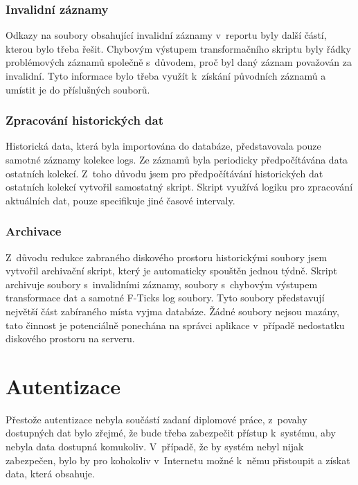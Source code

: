 \documentclass[thesis=M,czech]{FITthesis}[2012/06/26]
\begin{document}
      \subsubsection{Invalidní záznamy}

        Odkazy na soubory obsahující invalidní záznamy v~reportu
        byly další částí, kterou bylo třeba řešit.
        Chybovým výstupem transformačního skriptu byly řádky
        problémových záznamů společně s~důvodem, proč byl daný záznam považován za invalidní.
        Tyto informace bylo třeba využít k~získání původních záznamů a umístit je do příslušných souborů.

      \subsubsection{Zpracování historických dat}
        
        Historická data, která byla importována do databáze,
        představovala pouze samotné záznamy kolekce logs.
        Ze záznamů byla periodicky předpočítávána
        data ostatních kolekcí.
        Z~toho důvodu jsem pro předpočítávání historických
        dat ostatních kolekcí vytvořil samostatný skript.
        Skript využívá logiku pro zpracování aktuálních dat,
        pouze specifikuje jiné časové intervaly.

      \subsubsection{Archivace}
        
        Z~důvodu redukce zabraného diskového
        prostoru historickými soubory jsem
        vytvořil archivační skript, který je automaticky spouštěn jednou týdně.
        Skript archivuje soubory s~invalidními záznamy,
        soubory s~chybovým výstupem transformace dat a samotné F-Ticks log soubory.
        Tyto soubory představují největší část zabíraného místa vyjma databáze.
        Žádné soubory nejsou mazány, tato činnost
        je potenciálně ponechána na správci aplikace v~případě nedostatku diskového prostoru na serveru.

    \section{Autentizace}
      
      Přestože autentizace nebyla součástí zadaní diplomové práce,
      z~povahy dostupných dat bylo zřejmé, že bude třeba zabezpečit přístup k~systému,
      aby nebyla data dostupná komukoliv.
      V~případě, že by systém nebyl nijak zabezpečen, bylo by pro kohokoliv v~Internetu možné
      k~němu přistoupit a získat data, která obsahuje.
\end{document}
